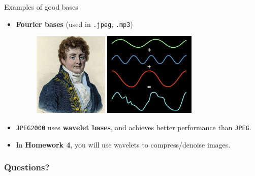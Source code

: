 \documentclass{beamer}
\begin{document}
\begin{frame}[t]{Examples of good bases}
	\begin{itemize}
		\item \textbf{Fourier bases} (used in \texttt{.jpeg}, \texttt{.mp3})
			\begin{figure}
	\includegraphics[height=4cm]{./fourier.jpeg}
	\hspace{1cm}
	\includegraphics[height=4cm]{./fourier_dec.jpg}
			\end{figure}

		\item \texttt{JPEG2000} uses \textbf{wavelet bases}, and achieves better performance than \texttt{JPEG}.
		\item In \textbf{Homework 4}, you will use wavelets to compress/denoise images.
	\end{itemize}
\end{frame}
\appendix
\backupbegin
\begin{frame}
	\frametitle{Questions?}
\end{frame}
\backupend
\end{document}
